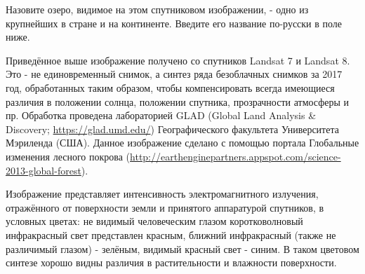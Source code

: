 
Назовите озеро, видимое на этом спутниковом изображении, - одно из крупнейших в стране и на континенте. Введите его название по-русски в поле ниже.


Приведённое выше изображение получено со спутников Landsat 7 и Landsat 8. Это - не единовременный снимок, 
а синтез ряда безоблачных снимков за 2017 год, обработанных таким образом, чтобы компенсировать всегда 
имеющиеся различия в положении солнца, положении спутника, прозрачности атмосферы и пр. 
Обработка проведена лабораторией GLAD (Global Land Analysis \& Discovery; \url{https://glad.umd.edu/}) Географического факультета Университета Мэриленда (США). 
Данное изображение сделано с помощью портала Глобальные изменения лесного покрова (\url{http://earthenginepartners.appspot.com/science-2013-global-forest}).

Изображение представляет интенсивность электромагнитного излучения, отражённого от поверхности земли и принятого аппаратурой спутников, в условных цветах: не видимый человеческим глазом коротковолновый инфракрасный свет представлен красным, ближний инфракрасный (также не различимый глазом) - зелёным, видимый красный свет - синим. В таком цветовом синтезе хорошо видны различия в растительности и влажности поверхности.

\solutionSection

